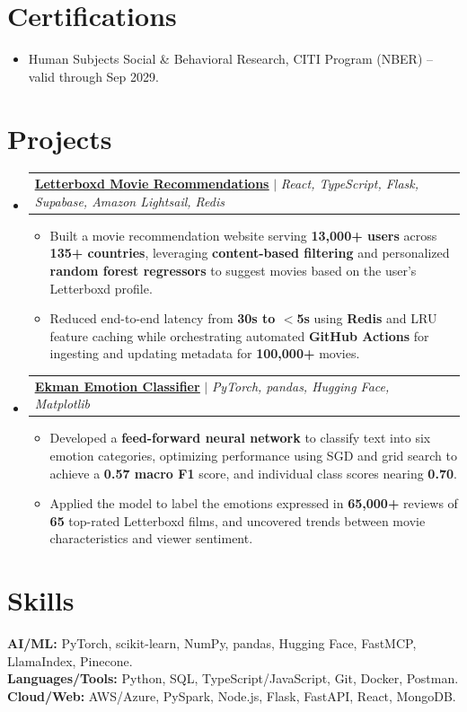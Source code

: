 \documentclass[letterpaper,11pt]{article}
\makeatletter
\newcommand{\resumeItem}[1]{
  \item\small{
    {#1 \vspace{-2pt}}
  }
}
\newcommand{\resumeProjectHeading}[2]{
    \item
    \begin{tabular*}{0.97\textwidth}{l@{\extracolsep{\fill}}r}
      \small#1 & #2 \\
    \end{tabular*}\vspace{-7pt}
}
\newcommand{\resumeSubHeadingListStart}{\begin{itemize}[leftmargin=0.15in, label={}]}
\newcommand{\resumeSubHeadingListEnd}{\end{itemize}}
\newcommand{\resumeItemListStart}{\begin{itemize}}
\newcommand{\resumeItemListEnd}{\end{itemize}\vspace{-5pt}}
\makeatother
\begin{document}
\section{Certifications}
          \resumeItemListStart
            \resumeItem{Human Subjects Social \& Behavioral Research, CITI Program (NBER) -- valid through Sep 2029.}
          \resumeItemListEnd
          
\section{Projects}
    \resumeSubHeadingListStart
    
      \resumeProjectHeading
          {\textbf{\href{https://recommendations.victorverma.com/}{\underline{Letterboxd Movie Recommendations}}} $|$ \textit{React, TypeScript, Flask, Supabase, Amazon Lightsail, Redis}}{}          
          \resumeItemListStart
            \resumeItem{Built a movie recommendation website serving \textbf{13,000+ users} across \textbf{135+ countries}, leveraging \textbf{content-based filtering} and personalized \textbf{random forest regressors} to suggest movies based on the user’s Letterboxd profile.}
            \resumeItem{Reduced end-to-end latency from \textbf{30s to $<$5s} using \textbf{Redis} and LRU feature caching while orchestrating automated \textbf{GitHub Actions} for ingesting and updating metadata for \textbf{100,000+} movies.}
          \resumeItemListEnd
          
      \resumeProjectHeading
          {\textbf{\href{https://github.com/victorverma3/Movie-Review-Emotions}{\underline{Ekman Emotion Classifier}}} $|$ \textit{PyTorch, pandas, Hugging Face, Matplotlib}}{}          
          \resumeItemListStart
            \resumeItem{Developed a \textbf{feed-forward neural network} to classify text into six emotion categories, optimizing performance using SGD and grid search to achieve a \textbf{0.57 macro F1} score, and individual class scores nearing \textbf{0.70}.}
            \resumeItem{Applied the model to label the emotions expressed in \textbf{65,000+} reviews of \textbf{65} top-rated Letterboxd films, and uncovered trends between movie characteristics and viewer sentiment.}
          \resumeItemListEnd
          
    \resumeSubHeadingListEnd

\section{Skills}
 \begin{itemize}[leftmargin=0.15in, label={}]
    \small{\item{
     \textbf{AI/ML:}{ PyTorch, scikit-learn, NumPy, pandas, Hugging Face, FastMCP, LlamaIndex, Pinecone.} \\
     \textbf{Languages/Tools:}{ Python, SQL, TypeScript/JavaScript, Git, Docker, Postman.} \\
     \textbf{Cloud/Web:}{ AWS/Azure, PySpark, Node.js, Flask, FastAPI, React, MongoDB.}
    }}
 \end{itemize}

\end{document}
